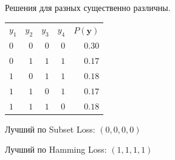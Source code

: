 \documentclass[a0paper,portrait]{baposter}
\newcommand{\y}{\mathbf{y}}
\begin{document}
\begin{poster}
{Решения для разных существенно различны.

	\begin{tabular}{lrrrr}
		$y_1$ & $y_2$ & $y_3$ & $y_4$ & $P(\y)$\\
		$0$ & $0$ & $0$ & $0$ & $0.30$\\
		$0$ & $1$ & $1$ & $1$ & $0.17$\\
		$1$ & $0$ & $1$ & $1$ & $0.18$\\
		$1$ & $1$ & $0$ & $1$ & $0.17$\\
		$1$ & $1$ & $1$ & $0$ & $0.18$\\
	\end{tabular}



Лучший по Subset Loss: $(0, 0, 0, 0)$

Лучший по Hamming Loss: $(1, 1, 1, 1)$

}


\end{poster}
\end{document}

